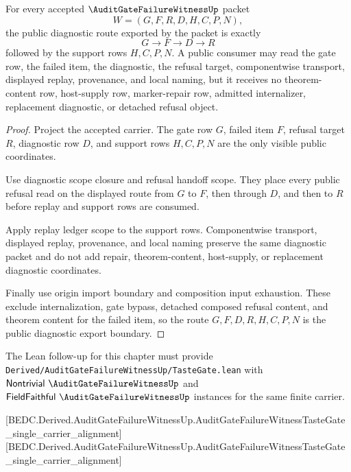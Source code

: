 \begin{theorem}
\label{thm:auditgatefailurewitness-public-diagnostic-export}
For every accepted $\AuditGateFailureWitnessUp$ packet
$$
W=(G,F,R,D,H,C,P,N),
$$
the public diagnostic route exported by the packet is exactly
$$
G\longrightarrow F\longrightarrow D\longrightarrow R
$$
followed by the support rows $H,C,P,N$. A public consumer may read the gate row, the failed item, the diagnostic, the refusal target, componentwise transport, displayed replay, provenance, and local naming, but it receives no theorem-content row, host-supply row, marker-repair row, admitted internalizer, replacement diagnostic, or detached refusal object.
\end{theorem}
\begin{proof}
Project the accepted carrier. The gate row $G$, failed item $F$, refusal target $R$, diagnostic row $D$, and support rows $H,C,P,N$ are the only visible public coordinates.

Use diagnostic scope closure and refusal handoff scope. They place every public refusal read on the displayed route from $G$ to $F$, then through $D$, and then to $R$ before replay and support rows are consumed.

Apply replay ledger scope to the support rows. Componentwise transport, displayed replay, provenance, and local naming preserve the same diagnostic packet and do not add repair, theorem-content, host-supply, or replacement diagnostic coordinates.

Finally use origin import boundary and composition input exhaustion. These exclude internalization, gate bypass, detached composed refusal content, and theorem content for the failed item, so the route $G,F,D,R,H,C,P,N$ is the public diagnostic export boundary.
\end{proof}

The Lean follow-up for this chapter must provide \texttt{Derived/AuditGateFailureWitnessUp/TasteGate.lean} with $\mathsf{Nontrivial}\ \AuditGateFailureWitnessUp$ and $\mathsf{FieldFaithful}\ \AuditGateFailureWitnessUp$ instances for the same finite carrier.

[BEDC.Derived.AuditGateFailureWitnessUp.AuditGateFailureWitnessTasteGate\_single\_carrier\_alignment]
[BEDC.Derived.AuditGateFailureWitnessUp.AuditGateFailureWitnessTasteGate\_single\_carrier\_alignment]

